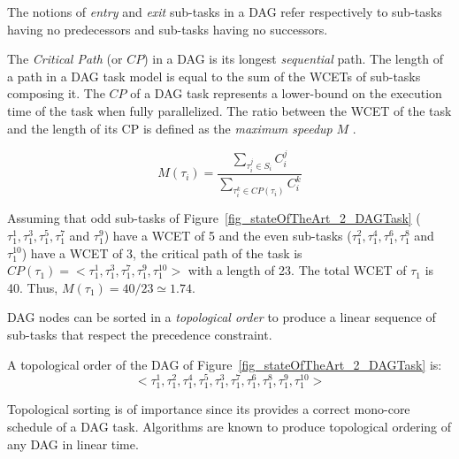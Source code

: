 \documentclass[main.tex]{subfiles}
\begin{document}
The notions of \emph{entry} and \emph{exit} sub-tasks in a DAG refer
respectively to sub-tasks having no predecessors and sub-tasks having no
successors.


The \emph{Critical Path} (or $CP$) in a DAG is its longest \emph{sequential}
path. The length of a path in a DAG task model is equal to the sum of the WCETs
of sub-tasks composing it. The $CP$ of a DAG task represents a lower-bound on
the execution time of the task when fully parallelized. The ratio between the
WCET of the task and the length of its CP is defined as the \emph{maximum
speedup} $M$ \cite{Hill2008}.

\begin{displaymath}
    M(\tau_i) = \dfrac{ \underset{\tau_i^j \in S_i}{\sum} C_i^j}{ \underset{ \tau_i^k \in CP(\tau_i) }{\sum} C_i^k}
\end{displaymath}

\begin{example}
    Assuming that odd sub-tasks of Figure~\ref{fig_stateOfTheArt_2_DAGTask} 
    ($\tau_1^1 , \tau_1^3, \tau_1^5, \tau_1^7$ and $\tau_1^9$) have a WCET of 5
    and the even sub-tasks 
    ($\tau_1^2 , \tau_1^4, \tau_1^6, \tau_1^8$ and $\tau_1^{10}$) have a WCET
    of 3, the critical path of the task is $CP(\tau_1) = <\tau_1^1 , \tau_1^3,
    \tau_1^7, \tau_1^9 , \tau_1^{10}>$ with a length of 23. The total WCET of
    $\tau_1$ is 40. Thus, $M(\tau_1) = 40/23 \simeq 1.74$. 
\end{example}

DAG nodes can be sorted in a \emph{topological order} to produce a linear
sequence of sub-tasks that respect the precedence constraint.

\begin{example}
    A topological order of the DAG of Figure~\ref{fig_stateOfTheArt_2_DAGTask} is:
    $$< \tau_1^1 , \tau_1^2 , \tau_1^4 , \tau_1^5, \tau_1^3 , \tau_1^7 , \tau_1^6 , \tau_1^8 , \tau_1^9 , \tau_1^{10} >$$
\end{example}

Topological sorting is of importance since its provides a correct mono-core
schedule of a DAG task. Algorithms are known to produce topological ordering of
any DAG in linear time.\\
\end{document}
